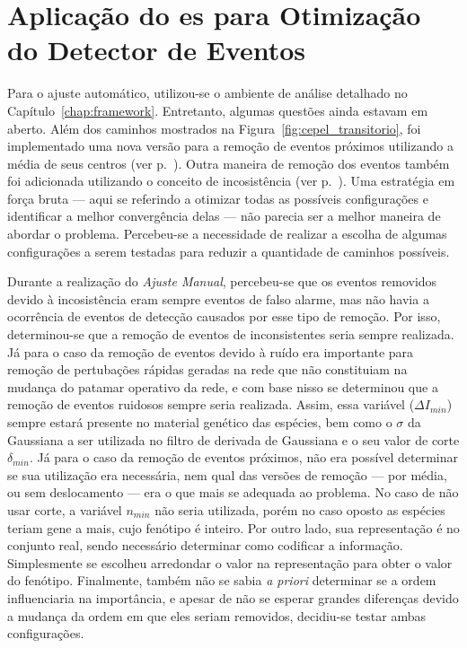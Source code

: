 \section[Aplicação do ES para Otimização do Detector de Eventos]{
Aplicação do \acf{es} para Otimização do Detector de Eventos}
\label{sec:aplic_es}

Para o ajuste automático, utilizou-se o ambiente de análise detalhado
no Capítulo~\ref{chap:framework}. Entretanto, algumas questões ainda
estavam em aberto. Além dos caminhos mostrados na
Figura~\ref{fig:cepel_transitorio}, foi implementado uma nova versão
para a remoção de eventos próximos utilizando a média de seus centros
(ver p.~\pageref{text:media}). Outra maneira de remoção dos eventos
também foi adicionada utilizando o conceito de incosistência (ver
p.~\pageref{text:incosistentes}). Uma estratégia em força bruta ---
aqui se referindo a otimizar todas as possíveis configurações e
identificar a melhor convergência delas --- não parecia ser a melhor
maneira de abordar o problema. Percebeu-se a necessidade de realizar a
escolha de algumas configurações a serem testadas para reduzir a
quantidade de caminhos possíveis.

Durante a realização do \emph{Ajuste Manual}, percebeu-se que os
eventos removidos devido à incosistência eram sempre eventos de falso
alarme, mas não havia a ocorrência de eventos de detecção causados por
esse tipo de remoção. Por isso, determinou-se que a remoção de eventos de
inconsistentes seria sempre realizada. Já para o caso da remoção de
eventos devido à ruído era importante para remoção de pertubações
rápidas geradas na rede que não constituiam na mudança do patamar
operativo da rede, e com base nisso se determinou que a remoção de
eventos ruidosos sempre seria realizada. Assim, essa variável
($\Delta I_{min}$) sempre estará presente no material genético das
espécies, bem como o $\sigma$ da Gaussiana a ser utilizada no filtro
de derivada de Gaussiana e o seu valor de corte $\delta_{min}$. Já
para o caso da remoção de eventos próximos, não era possível
determinar se sua utilização era necessária, nem qual das versões de
remoção --- por média, ou sem deslocamento --- era o que mais se
adequada ao problema. No caso de não usar corte, a variável $n_{min}$
não seria utilizada, porém no caso oposto as espécies teriam gene a
mais, cujo fenótipo é inteiro. Por outro lado, sua representação é no
conjunto real, sendo necessário determinar como codificar a
informação. Simplesmente se escolheu arredondar o valor na
representação para obter o valor do fenótipo. Finalmente, também não
se sabia \emph{a priori} determinar se a ordem influenciaria na
importância, e apesar de não se esperar grandes diferenças devido a
mudança da ordem em que eles seriam removidos, decidiu-se testar ambas
configurações.  

